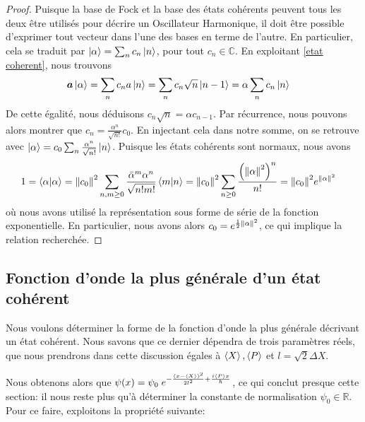 \documentclass[11pt,oneside,a4paper]{article}
\begin{document}
\begin{proof}
  Puisque la base de Fock et la base des états cohérents peuvent tous les deux être utilisés pour décrire un Oscillateur Harmonique, il doit être possible d'exprimer tout vecteur dans l'une des bases en terme de l'autre. En particulier, cela se traduit par $\ket{\alpha} = \sum_n c_n \ket{n}$, pour tout $c_n\in\mathbb{C}$. En exploitant \eqref{etat coherent}, nous trouvons
  \begin{align}
    \bm{a}\ket{\alpha} = \sum_n c_n a\ket{n} = \sum_n c_n\sqrt{n}\ket{n-1} &= \alpha\sum_n c_n \ket{n}
  \end{align}
  De cette égalité, nous déduisons $c_n\sqrt{n}=\alpha c_{n-1}$. Par récurrence, nous pouvons alors montrer que $c_n = \frac{\alpha^n}{\sqrt{n!}}c_0$. En injectant cela dans notre somme, on se retrouve avec $\ket{\alpha} = c_0\sum_n \frac{\alpha^n}{\sqrt{n!}}\ket{n}$. Puisque les états cohérents sont normaux, nous avons
  \begin{align}
    1 = \braket{\alpha} &= \norm{c_0}^2 \sum_{n,m\geq 0} \frac{\bar{\alpha}^m\alpha^n}{\sqrt{n!m!}}\braket{m}{n} = \norm{c_0}^2\sum_{n\geq 0} \frac{\left(\norm{\alpha}^2\right)^n}{n!} = \norm{c_0}^2e^{\norm{\alpha}^2}
  \end{align}
  où nous avons utilisé la représentation sous forme de série de la fonction exponentielle. En particulier, nous avons alors $c_0 = e^{\frac{1}{2}\norm{\alpha}^2}$, ce qui implique la relation recherchée.
\end{proof}

\subsection{Fonction d'onde la plus générale d'un état cohérent}
Nous voulons déterminer la forme de la fonction d'onde la plus générale décrivant un état cohérent. Nous savons que ce dernier dépendra de trois paramètres réels, que nous prendrons dans cette discussion égales à $\expval{X},\expval{P}$ et $l = \sqrt{2}\Delta X$.

Nous obtenons alors que $\psi(x) = \psi_0 \; e^{-\frac{\left(x-\expval{X}\right)^2}{2l^2}+\frac{i\expval{P}x}{\hbar}}$, ce qui conclut presque cette section: il nous reste plus qu'à déterminer la constante de normalisation $\psi_0\in\mathbb{R}$. Pour ce faire, exploitons la propriété suivante:
\end{document}

